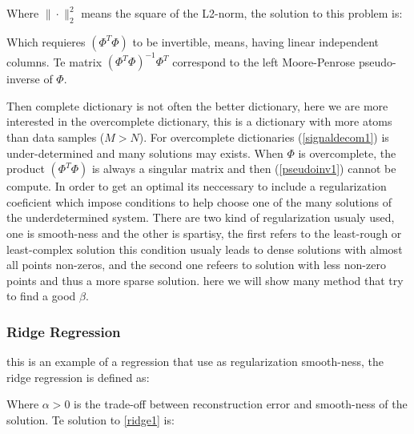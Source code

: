 
\newp Where $\| \cdotp \|_{2}^{2}$ means the square of the L2-norm, the solution to this problem is:


\newp Which requieres $(\Phi^{T}\Phi)$ to be invertible, means, having linear independent columns. Te matrix $(\Phi^{T}\Phi)^{-1}\Phi^{T}$ correspond to the left Moore-Penrose pseudo-inverse of $\Phi$.

\newp Then complete dictionary is not often the better dictionary, here we are more interested in the overcomplete dictionary, this is a dictionary with more atoms than data samples ($M > N$). For overcomplete dictionaries (\ref{signaldecom1}) is under-determined and many solutions may exists. When $\Phi$ is overcomplete, the product $(\Phi^{T}\Phi)$ is always a singular matrix and then (\ref{pseudoinv1}) cannot be compute. In order to get an optimal its neccessary to include a regularization coeficient which impose conditions to help choose one of the many solutions of the underdetermined system. There are two kind of regularization usualy used, one is smooth-ness and the other is spartisy, the first refers to the least-rough or least-complex solution this condition usualy leads to dense solutions with almost all points non-zeros, and the second one refeers to solution with less non-zero points and thus a more sparse solution. here we will show many method that try to find a good $\beta$.

\subsubsection{Ridge Regression}
\newp this is an example of a regression that use as regularization smooth-ness, the ridge regression is defined as:


\newp Where $\alpha > 0$ is the trade-off between reconstruction error and smooth-ness of the solution. Te solution to \ref{ridge1} is:






